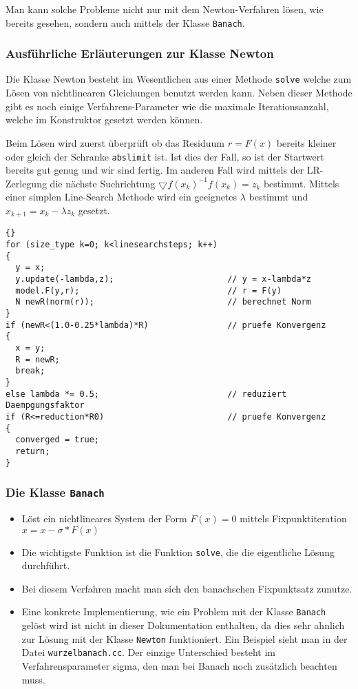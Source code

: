 \documentclass[a4paper,11pt]{article}
\theoremstyle{definition}
\begin{document}
Man kann solche Probleme nicht nur mit dem Newton-Verfahren lösen, wie
bereits gesehen, sondern auch mittels der Klasse \lstinline{Banach}.

\subsubsection{Ausführliche Erläuterungen zur Klasse Newton}

Die Klasse Newton besteht im Wesentlichen aus einer Methode
\lstinline{solve} welche zum Lösen von nichtlinearen Gleichungen
benutzt werden kann. Neben dieser Methode gibt es noch einige
Verfahrens-Parameter wie die maximale Iterationsanzahl, welche im
Konstruktor gesetzt werden können.

Beim Lösen wird zuerst überprüft ob das Residuum $r=F(x)$ bereits
kleiner oder gleich der Schranke \lstinline{abslimit} ist. Ist dies
der Fall, so ist der Startwert bereits gut genug und wir sind
fertig. Im anderen Fall wird mittels der LR-Zerlegung die nächste
Suchrichtung $\bigtriangledown f(x_k)^{-1}f(x_k) = z_k$
bestimmt. Mittels einer simplen Line-Search Methode wird ein
geeignetes $\lambda$ bestimmt und $x_{k+1}=x_k-\lambda z_k$ gesetzt.

{\footnotesize{\begin{lstlisting}{}
for (size_type k=0; k<linesearchsteps; k++)
{
  y = x;
  y.update(-lambda,z);                       // y = x-lambda*z
  model.F(y,r);                              // r = F(y)
  N newR(norm(r));                           // berechnet Norm
}
if (newR<(1.0-0.25*lambda)*R)                // pruefe Konvergenz
{
  x = y;
  R = newR;
  break;
}
else lambda *= 0.5;                          // reduziert Daempgungsfaktor
if (R<=reduction*R0)                         // pruefe Konvergenz
{
  converged = true;
  return;
}
\end{lstlisting}}}


\subsubsection{Die Klasse \lstinline{Banach}}
\begin{itemize}
\item Löst ein nichtlineares System der Form $F(x)=0$ mittels
  Fixpunktiteration $x = x - \sigma*F(x)$
\item Die wichtigste Funktion ist die Funktion \lstinline{solve}, die
  die eigentliche Lösung durchführt.
\item Bei diesem Verfahren macht man sich den banachschen Fixpunktsatz
  zunutze.
\item Eine konkrete Implementierung, wie ein Problem mit der Klasse
  \lstinline{Banach} gelöst wird ist nicht in dieser Dokumentation
  enthalten, da dies sehr ahnlich zur Lösung mit der Klasse
  \lstinline{Newton} funktioniert. Ein Beispiel sieht man in der Datei
  \lstinline{wurzelbanach.cc}. Der einzige Unterschied besteht im
  Verfahrensparameter sigma, den man bei Banach noch zusätzlich
  beachten muss.
\end{itemize}
\end{document}
